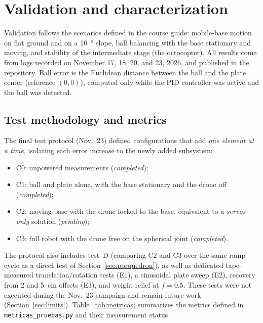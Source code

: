 \section{Validation and characterization}
\label{sec:validation}

Validation follows the scenarios defined in the course guide: mobile-base motion on flat ground and on a \SI{10}{\degree} slope, ball balancing with the base stationary and moving, and stability of the intermediate stage (the octocopter). All results come from logs recorded on November 17, 18, 20, and 23, 2026, and published in the repository. Ball error is the Euclidean distance between the ball and the plate center (reference $(0,0)$), computed only while the PID controller was active and the ball was detected.

\subsection{Test methodology and metrics}
\label{sec:metodologia}
The final test protocol (Nov.~23) defined configurations that add \emph{one element at a time}, isolating each error increase to the newly added subsystem:
\begin{itemize}
  \item C0: unpowered measurements (\emph{completed});
  \item C1: ball and plate alone, with the base stationary and the drone off (\emph{completed});
  \item C2: moving base with the drone locked to the base, equivalent to a \emph{servos-only} solution (\emph{pending});
  \item C3: full robot with the drone free on the spherical joint (\emph{completed}).
\end{itemize}
The protocol also includes test~D (comparing C2 and C3 over the same ramp cycle as a direct test of Section~\ref{sec:porquedron}), as well as dedicated tape-measured translation/rotation tests (E1), a sinusoidal plate sweep (E2), recovery from 2 and \SI{5}{\centi\metre} offsets (E3), and weight relief at $f=0.5$. These tests were not executed during the Nov.~23 campaign and remain future work (Section~\ref{sec:limits}). Table~\ref{tab:metricas} summarizes the metrics defined in \texttt{metricas\_pruebas.py} and their measurement status.

